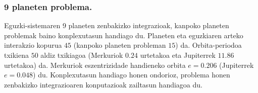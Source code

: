 \begin{table}[h]
\caption[Kanpoko planeten problema.]{Kanpoko planeten problema.}
\label{tab:oss0}       %
\centering
{}
\end{table}


\subsubsection*{9 planeten problema.}


Eguzki-sistemaren 9 planeten zenbakizko integrazioak, kanpoko planeten problemak baino konplexutasun handiago du. Planeten eta eguzkiaren arteko interakzio kopurua $45$ (kanpoko planeten probleman $15$) da. Orbita-periodoa txikiena  $50$ aldiz txikiagoa (Merkuriok $0.24$ urtetakoa eta Jupiterrek $11.86$ urtetakoa) da. Merkuriok eszentrizidade handieneko orbita $e=0.206$ (Jupiterrek $e=0.048$) du. Konplexutasun handiago honen ondorioz, problema honen zenbakizko integrazioaren konputazioak zailtasun handiagoa du.   

